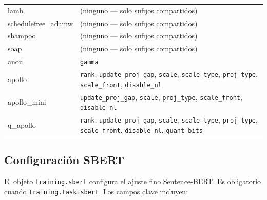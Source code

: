 \begin{longtable}{>{\ttfamily}l>{\raggedright\arraybackslash}p{10cm}}
lamb & (ninguno --- solo sufijos compartidos) \\
schedulefree\_adamw & (ninguno --- solo sufijos compartidos) \\
shampoo & (ninguno --- solo sufijos compartidos) \\
soap & (ninguno --- solo sufijos compartidos) \\
anon & \texttt{gamma} \\
apollo & \texttt{rank}, \texttt{update\_proj\_gap}, \texttt{scale}, \texttt{scale\_type}, \texttt{proj\_type}, \texttt{scale\_front}, \texttt{disable\_nl} \\
apollo\_mini & \texttt{update\_proj\_gap}, \texttt{scale}, \texttt{proj\_type}, \texttt{scale\_front}, \texttt{disable\_nl} \\
q\_apollo & \texttt{rank}, \texttt{update\_proj\_gap}, \texttt{scale}, \texttt{scale\_type}, \texttt{proj\_type}, \texttt{scale\_front}, \texttt{disable\_nl}, \texttt{quant\_bits} \\
\end{longtable}

\subsection{Configuración SBERT}
\label{subsec:sbert-config}

El objeto \texttt{training.sbert} configura el ajuste fino Sentence-BERT. Es obligatorio cuando \texttt{training.task=sbert}. Los campos clave incluyen:

